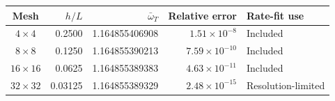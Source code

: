 \begin{tabularx}{\textwidth}{@{}c r r r l@{}}
\toprule
Mesh & $h/L$ & $\bar{\omega}_T$ & Relative error & Rate-fit use \\
\midrule
$4\times4$ & 0.2500 & 1.164855406908 & $1.51\times10^{-8}$ & Included \\
$8\times8$ & 0.1250 & 1.164855390213 & $7.59\times10^{-10}$ & Included \\
$16\times16$ & 0.0625 & 1.164855389383 & $4.63\times10^{-11}$ & Included \\
$32\times32$ & 0.03125 & 1.164855389329 & $2.48\times10^{-15}$ & Resolution-limited \\
\bottomrule
\end{tabularx}
